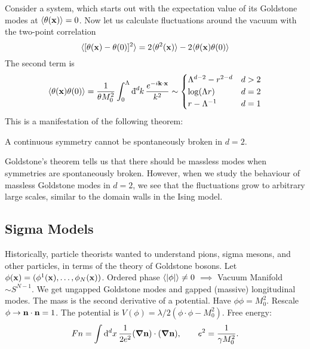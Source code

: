 
Consider a system, which starts out with the expectation value of its Goldstone modes at $\langle \theta (\vb{x}) \rangle = 0$.
Now let us calculate fluctuations around the vacuum with the two-point correlation
\begin{equation}
  \langle [\theta(\vb{x}) - \theta(0)]^2 \rangle = 2 \langle \theta^2 (\vb{x}) \rangle - 2 \langle \theta(\vb{x}) \theta(0) \rangle
\end{equation}
The second term is
\begin{equation}
  \langle \theta(\vb{x}) \theta(0) \rangle = \frac{1}{\theta M_0^2} \int_0^\Lambda \bdd[d]{k} \frac{e^{-i\vb{k} \cdot \vb{x}}}{ k^2} \sim
  \begin{cases}
    \Lambda^{d-2} - r^{2-d} & d > 2 \\
    \log(\Lambda r) & d = 2 \\
    r - \Lambda^{-1} & d = 1
  \end{cases}
\end{equation}
This is a manifestation of the following theorem:
\begin{theorem}
  A continuous symmetry cannot be spontaneously broken in $d = 2$.
\end{theorem}

Goldstone's theorem tells us that there should be massless modes when symmetries are spontaneously broken. However, when we study the behaviour of massless Goldstone modes in $d = 2$, we see that the fluctuations grow to arbitrary large scales, similar to the domain walls in the Ising model.

\subsection*{Sigma Models}%

Historically, particle theorists wanted to understand pions, sigma mesons, and other particles, in terms of the theory of Goldstone bosons.
Let $\phi(\vb{x}) = (\phi^1(\vb{x}), \dots, \phi_N(\vb{x}) )$.
Ordered phase $\langle \abs{\phi} \rangle \neq 0$ $\implies$ Vacuum Manifold $\sim S^{N-1}$.
We get ungapped Goldstone modes and gapped (massive) longitudinal modes.
The mass is the second derivative of a potential.
Have $\phi\phi = M_0^2$. Rescale $\phi \to \vb{n} \cdot \vb{n} = 1$.
The potential is $V(\phi) = \lambda/2 (\phi \cdot \phi - M_0^2)$.
Free energy: 
\begin{equation}
  F{n} = \int \dd[d]{x} \frac{1}{2 e^2} (\grad \vb{n}) \cdot (\grad \vb{n}), \qquad e^2 = \frac{1}{\gamma M_0^2}.
\end{equation}

